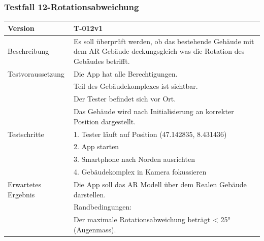 \documentclass[a4paper]{scrreprt}
\begin{document}
\subsubsection{Testfall 12-Rotationsabweichung}
\begin{tabularx}{\textwidth}{|l|X|}
\hline 
	Version &
	T-012v1 \\ 
\hline 
	Beschreibung & 
	Es soll überprüft werden, ob das bestehende Gebäude mit dem AR Gebäude deckungsgleich was die Rotation des Gebäudes betrifft. \\ 
\hline 
	Testvoraussetzung &
	Die App hat alle Berechtigungen. \\ &
	Teil des Gebäudekomplexes ist sichtbar. \\ &
	Der Tester befindet sich vor Ort. \\ &
	Das Gebäude wird nach Initialisierung an korrekter Position dargestellt. \\
\hline 
	Testschritte & 
		1. Tester läuft auf Position (47.142835, 8.431436)\\ &
		2. App starten\\ &
		3. Smartphone nach Norden ausrichten\\ &
		4. Gebäudekomplex in Kamera fokussieren\\
\hline
	Erwartetes Ergebnis &
	Die App soll das AR Modell über dem Realen Gebäude darstellen. \\ &
	Randbedingungen: \\ &
		Der maximale Rotationsabweichung beträgt < \ang{25} (Augenmass). \\ 
\hline 
\end{tabularx}
\end{document}
